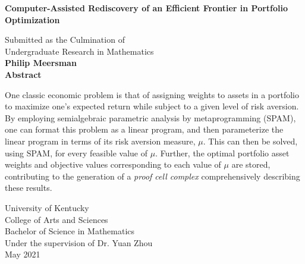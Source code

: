 \documentclass{article}
\begin{document}
\begin{titlepage}
\begin{center}
\vspace{1cm}
\large
\textbf{Computer-Assisted Rediscovery of an Efficient Frontier in Portfolio Optimization}

\normalsize
\vspace{.5cm}
Submitted as the Culmination of \\Undergraduate Research in Mathematics\\
\vspace{.5cm}
\textbf{Philip Meersman}\\
\vspace{.5cm}
\large
\vspace{.5cm}
\normalsize
\textbf{Abstract}
\end{center}
One classic economic problem is that of assigning weights to assets in a portfolio
to maximize one's expected return while subject to a given level of risk aversion. 
By employing semialgebraic parametric analysis by metaprogramming (SPAM), one can format this problem as 
a linear program, and then parameterize 
the linear program in terms of its risk aversion measure, $\mu$. This can then be solved, using SPAM, for every feasible value of $\mu$. Further, the optimal portfolio asset weights and objective values corresponding
to each value of $\mu$ are stored, contributing to the generation of a \textit{proof cell complex} comprehensively describing these results.

\vfill
\begin{center}	
University of Kentucky\\
College of Arts and Sciences\\
Bachelor of Science in Mathematics\\
Under the supervision of Dr. Yuan Zhou\\
May 2021\\
\end{center}
\end{titlepage}
\tableofcontents
\pagebreak
{}
\end{document}
